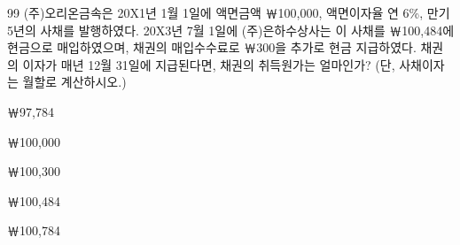 \begin{question}{99}
(주)오리온금속은 20X1년 1월 1일에 액면금액 ￦100,000, 액면이자율 연 6\%, 만기 5년의 사채를 발행하였다. 20X3년 7월 1일에 (주)은하수상사는 이 사채를 ￦100,484에 현금으로 매입하였으며, 채권의 매입수수료로 ￦300을 추가로 현금 지급하였다. 채권의 이자가 매년 12월 31일에 지급된다면, 채권의 취득원가는 얼마인가? (단, 사채이자는 월할로 계산하시오.)
\begin{choices}
  \item ￦97,784
  \item ￦100,000
  \item ￦100,300
  \item ￦100,484
  \item ￦100,784
\end{choices}
\end{question}
